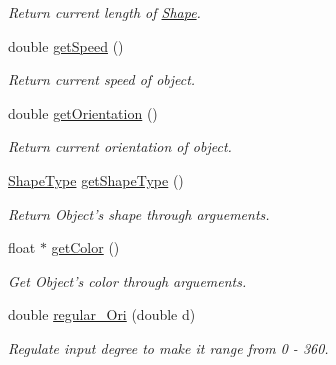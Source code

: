 \begin{DoxyCompactItemize}
\begin{DoxyCompactList}\small\item\em Return current length of \hyperlink{classShape}{Shape}. \end{DoxyCompactList}\item 
double \hyperlink{classShape_a5d515965a741032ee2d9ffad45d99f88}{get\-Speed} ()
\begin{DoxyCompactList}\small\item\em Return current speed of object. \end{DoxyCompactList}\item 
double \hyperlink{classShape_a0b50a459fa51ff3ae311fc09194966e6}{get\-Orientation} ()
\begin{DoxyCompactList}\small\item\em Return current orientation of object. \end{DoxyCompactList}\item 
\hyperlink{Shape_8h_a5a4538eeab397888d88a4eefcc5a1345}{Shape\-Type} \hyperlink{classShape_a2ac50956512eba17938466857ba8a069}{get\-Shape\-Type} ()
\begin{DoxyCompactList}\small\item\em Return Object's shape through arguements. \end{DoxyCompactList}\item 
float $\ast$ \hyperlink{classShape_ab27ec7349bf8707b5f1ff4031af0923e}{get\-Color} ()
\begin{DoxyCompactList}\small\item\em Get Object's color through arguements. \end{DoxyCompactList}\item 
double \hyperlink{classShape_a716868f38999597e67b1d1ceaf4e0876}{regular\-\_\-\-Ori} (double d)
\begin{DoxyCompactList}\small\item\em Regulate input degree to make it range from 0 -\/ 360. \end{DoxyCompactList}\end{DoxyCompactItemize}
